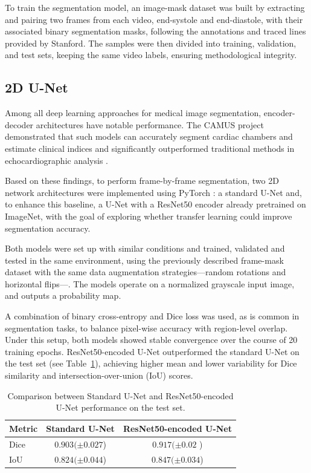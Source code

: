 \documentclass[runningheads]{llncs}
\begin{document}
To train the segmentation model, an image-mask dataset was built by extracting and pairing two frames from each video, end-systole and end-diastole, with their associated binary segmentation masks, following the annotations and traced lines provided by Stanford. The samples were then divided into training, validation, and test sets, keeping the same video labels, ensuring methodological integrity.

\subsection{2D U-Net}

Among all deep learning approaches for medical image segmentation, encoder-decoder architectures have notable performance. The CAMUS project demonstrated that such models can accurately segment cardiac chambers and estimate clinical indices and significantly outperformed traditional methods in echocardiographic analysis \cite{leclerc2019camus}.

Based on these findings, to perform frame-by-frame segmentation, two 2D network architectures were implemented using PyTorch \cite{paszke2019pytorch}\cite{qubvel2019smp}: a standard U-Net and, to enhance this baseline, a U-Net with a ResNet50 encoder already pretrained on ImageNet\cite{deng2009imagenet}, with the goal of exploring whether transfer learning could improve segmentation accuracy. 

Both models were set up with similar conditions and trained, validated and tested in the same environment, using the previously described frame-mask dataset with the same data augmentation strategies—random rotations and horizontal flips—. The models operate on a normalized grayscale input image, and outputs a probability map.

A combination of binary cross-entropy and Dice loss was used, as is common in segmentation tasks, to balance pixel-wise accuracy with region-level overlap. Under this setup, both models showed stable convergence over the course of 20 training epochs. ResNet50-encoded U-Net outperformed the standard U-Net on the test set (see Table~\ref{tab:segmentation-comparison}), achieving higher mean and lower variability for Dice similarity and intersection-over-union (IoU) scores. 

\begin{table}[ht]
\centering
\caption{Comparison between Standard U-Net and ResNet50-encoded U-Net performance on the test set.}
\label{tab:segmentation-comparison}
\begin{tabular}{|l|c|c|}
\hline
\textbf{Metric} & \textbf{Standard U-Net} & \textbf{ResNet50-encoded U-Net} \\
\hline
Dice            & $0.903  (\pm 0.027$)       & $0.917  (\pm 0.02$ )              \\
IoU             & $0.824  (\pm 0.044$)       & $0.847  (\pm 0.034$)               \\
\hline
\end{tabular}
\end{table}
\end{document}
